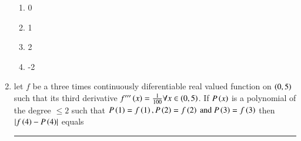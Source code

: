 \documentclass[journal]{IEEEtran}
\numberwithin{equation}{enumi}
\numberwithin{figure}{enumi}
\begin{document}
\begin{enumerate}
	\hfill{}
	\begin{multicols}{4}
		\begin{enumerate}
			\item 0
			\item 1
			\item 2
			\item -2
		\end{enumerate}
	\end{multicols}

	\item 
	let $f$ be a three times continuously diferentiable real valued function on $\left(0,5\right)$ such that its third derivative $f^{\prime\prime\prime}\left(x\right) = \frac{1}{100} \forall x \in \left(0,5\right)$. If $P\left(x\right)$ is a polynomial of the degree $\leq 2$ such that $P\left(1\right) = f\left(1\right), P\left(2\right) = f\left(2\right) \text{ and } P\left(3\right) = f\left(3\right)$ then $\left\vert f\left(4\right) - P\left(4\right)\right\vert$ equals \rule{1cm}{0.1pt}

	\hfill{}

\end{enumerate}
\end{document}
